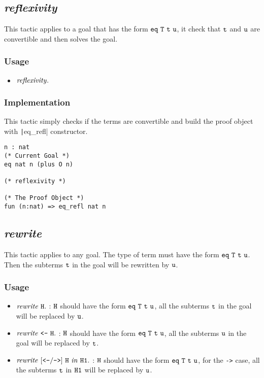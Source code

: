 \subsection{\it reflexivity}
This tactic applies to a goal that has the form $\tt eq\ T\ t\ u$, it check that $\tt t$ and $\tt u$ 
are convertible and then solves the goal.

\subsubsection*{Usage}
\begin{itemize}
\item ${\it reflexivity}.$
\end{itemize}

\subsubsection*{Implementation}
This tactic simply checks if the terms are convertible and build the proof object with \texttt|eq_refl| constructor.

\begin{center}
\begin{minipage}{0.7\textwidth}
\begin{verbatim}
n : nat
(* Current Goal *)  
eq nat n (plus O n)   

(* reflexivity *)

(* The Proof Object *)
fun (n:nat) => eq_refl nat n
\end{verbatim}
\end{minipage}
\end{center}

\subsection{\it rewrite}
This tactic applies to any goal.
The type of term must have the form $\tt eq\ T\ t\ u$.
Then the subterms $\tt t$ in the goal will be rewritten by $\tt u$.

\subsubsection*{Usage}
\begin{itemize}
\item ${\it rewrite\ \tt H}.$ : $\tt H$ should have the form $\tt eq\ T\ t\ u$, 
all the subterms $\tt t$ in the goal will be replaced by $\tt u$.
\item ${\it rewrite\ \texttt{<-}\ \tt H}.$ : $\tt H$ should have the form $\tt eq\ T\ t\ u$, 
    all the subterms $\tt u$ in the goal will be replaced by $\tt t$.
\item ${\it rewrite\ [\texttt{<-}/\texttt{->}]\ \tt H\ \it in\ \tt H1}.$ : 
    $\tt H$ should have the form $\tt eq\ T\ t\ u$, for the {\tt ->} case, all the 
    subterms $\tt t$ in $\tt H1$ will be replaced by $\tt u$.
\end{itemize}

